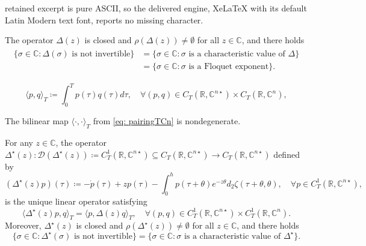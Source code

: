 \documentclass[10pt,a4paper]{amsart}
\begin{document}
retained excerpt is pure ASCII, so the delivered engine, XeLaTeX with its default Latin Modern text font, reports no missing character.
\begin{lemma} \label{lemma:Delta(z)closed}
The operator $\Delta(z)$ is closed and $\rho(\Delta(z)) \neq \emptyset$ for all $z \in \mathbb{C}$, and there holds
\begin{align} 
\begin{split} \label{eq:not inv is floquet}
    \{ \sigma \in \mathbb{C} : \Delta(\sigma) \mbox{ is not invertible} \} &= \{ \sigma \in \mathbb{C} : \sigma \mbox{ is a characteristic value of } \Delta \} \\
    & = \{\sigma \in \mathbb{C} : \sigma \mbox{ is a Floquet exponent} \}.    
\end{split}
\end{align}
\end{lemma}

\begin{equation} \label{eq: pairingTCn}
    \langle p,q \rangle_T \coloneqq \int_0^T  p(\tau)q(\tau) d \tau, \quad \forall (p,q) \in C_T(\mathbb{R},\mathbb{C}^{n \star}) \times C_T(\mathbb{R},\mathbb{C}^n),
\end{equation}

\begin{lemma} \label{lemma:nondegenerate}
The bilinear map $\langle \cdot, \cdot \rangle_T$ from \eqref{eq: pairingTCn} is nondegenerate.
\end{lemma}

\begin{lemma} \label{lemma:adjoint charac}
For any $z \in \mathbb{{C}}$, the operator $\Delta^\star(z) : \mathcal{D}(\Delta^\star(z)) \coloneqq C_T^1(\mathbb{R},\mathbb{C}^{n \star}) \subseteq C_T(\mathbb{R},\mathbb{C}^{n \star}) \to C_T(\mathbb{{R}},\mathbb{C}^{n \star})$ defined by
\begin{equation} \label{eq:adjoint charac operator}
    (\Delta^\star(z)p)(\tau) \coloneqq -\dot{p}(\tau) + zp(\tau) - \int_0^h   p(\tau + \theta) e^{-z \theta} d_2 \zeta(\tau + \theta,\theta), \quad \forall p \in C_T^1(\mathbb{R},\mathbb{C}^{n \star}), 
\end{equation}
is the unique linear operator satisfying
\begin{equation} \label{eq:pairing charac}
    \langle \Delta^\star(z)p,q \rangle_T = \langle p,\Delta(z)q \rangle_T, \quad \forall (p,q) \in C_T^1(\mathbb{R},\mathbb{C}^{n \star}) \times C_T^1(\mathbb{R},\mathbb{C}^n).
\end{equation}
Moreover, $\Delta^\star(z)$ is closed and $\rho(\Delta^\star(z)) \neq \emptyset$ for all $z \in \mathbb{C}$, and there holds
\begin{equation*} 
    \{ \sigma \in \mathbb{C} : \Delta^\star(\sigma) \mbox{ is not invertible} \} = \{ \sigma \in \mathbb{C} : \sigma \mbox{ is a characteristic value of } \Delta^\star \}. 
\end{equation*}
\end{lemma}
\end{document}
